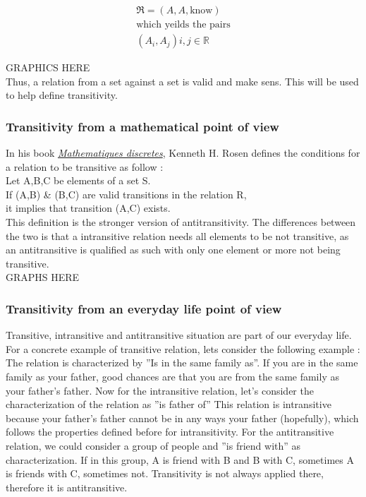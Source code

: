 \documentclass{article}
\begin{document}
	\begin{equation}
	\begin{split}
	
	\mathfrak{R} = (A,A, \text{know})\\
	\text{which yeilds the pairs} \\
	(A_{i}, A_{j}) i,j \in \mathbb{R}
	
	\end{split}
	\end{equation}

    GRAPHICS HERE\\	
    
	Thus, a relation from a set against a set is valid and make sens. This will be used to help define transitivity.
    
	\subsubsection{Transitivity from a mathematical point of view}
	\label{transitivity}
	In his book \underline{\textit{Mathematiques discretes}}, Kenneth H. Rosen defines the conditions
	for a relation to be transitive as follow : \\
	
    Let A,B,C be elements of a set S. \\
	If (A,B) \& (B,C) are valid transitions in the relation R,\\
    it implies that transition (A,C) exists. \\
    
    This definition is the stronger version of antitransitivity. The differences between the two 
    is that a intransitive relation needs all elements to be not transitive, as an antitransitive
     is qualified as such with 
    only one element or more not being transitive.\\
	GRAPHS HERE \\
	
	\subsubsection{Transitivity from an everyday life point of view}
    Transitive, intransitive and antitransitive situation are part of our
    everyday life. For a concrete example of transitive relation, lets consider
    the following example : The relation is characterized by ''Is in the same
    family as''. If you are in the same family as your father, good chances
    are that you are from the same family as your father's father. Now for the
    intransitive relation, let's consider the characterization of the relation
    as ''is father of'' This relation is intransitive because your father's
    father cannot be in any ways your father (hopefully), which follows the
    properties defined before for intransitivity. For the antitransitive
    relation, we could consider a group of people and ''is friend with'' as
    characterization. If in this group, A is friend with B and B with C,
    sometimes A is friends with C, sometimes not. Transitivity is not always
    applied there, therefore it is antitransitive.
    
\end{document}
